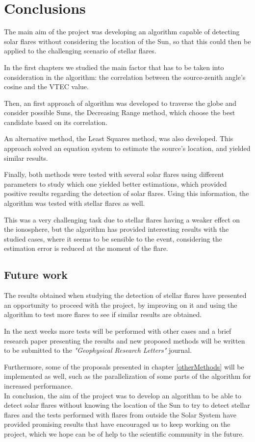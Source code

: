 \chapter{Conclusions}

The main aim of the project was developing an algorithm capable of detecting solar flares without considering the location of the Sun, so that this could then be applied to the challenging scenario of stellar flares.

In the first chapters we studied the main factor that has to be taken into consideration in the algorithm: the correlation between the source-zenith angle's cosine and the VTEC value.

Then, an first approach of algorithm was developed to traverse the globe and consider possible Suns, the Decreasing Range method, which choose the best candidate based on its correlation.

An alternative method, the Least Squares method, was also developed. This approach solved an equation system to estimate the source's location, and yielded similar results.

Finally, both methods were tested with several solar flares using different parameters to study which one yielded better estimations, which provided positive results regarding the detection of solar flares. Using this information, the algorithm was tested with stellar flares as well.

This was a very challenging task due to stellar flares having a weaker effect on the ionosphere, but the algorithm has provided interesting results with the studied cases, where it seems to be sensible to the event, considering the estimation error is reduced at the moment of the flare.
 
\section{Future work}

The results obtained when studying the detection of stellar flares have presented an opportunity to proceed with the project, by improving on it and using the algorithm to test more flares to see if similar results are obtained.

In the next weeks more tests will be performed with other cases and a brief research paper presenting the results and new proposed methods will be written to be submitted to the \textit{"Geophysical Research Letters"} journal.

Furthermore, some of the proposals presented in chapter \ref{otherMethods} will be implemented as well, such as the parallelization of some parts of the algorithm for increased performance. \\

In conclusion, the aim of the project was to develop an algorithm to be able to detect solar flares without knowing the location of the Sun to try to detect stellar flares and the tests performed with flares from outside the Solar System have provided promising results that have encouraged us to keep working on the project, which we hope can be of help to the scientific community in the future.




